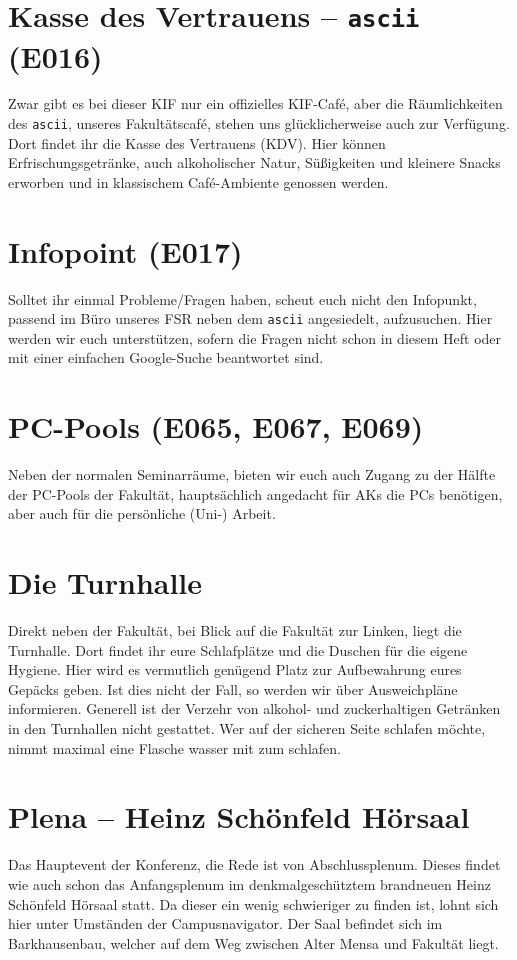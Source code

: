 \section*{Kasse des Vertrauens – \texttt{ascii} (E016)}
Zwar gibt es bei dieser KIF nur ein offizielles KIF-Café, aber die Räumlichkeiten des \texttt{ascii}, unseres Fakultätscafé, stehen uns glücklicherweise auch zur Verfügung.
Dort findet ihr die Kasse des Vertrauens (KDV).
Hier können Erfrischungsgetränke, auch alkoholischer Natur, Süßigkeiten und kleinere Snacks erworben und in klassischem Café-Ambiente genossen werden.

\section*{Infopoint (E017)}
Solltet ihr einmal Probleme/Fragen haben, scheut euch nicht den Infopunkt, passend im Büro unseres FSR neben dem \texttt{ascii} angesiedelt, aufzusuchen.
Hier werden wir euch unterstützen, sofern die Fragen nicht schon in diesem Heft oder mit einer einfachen Google-Suche beantwortet sind.

\section*{PC-Pools (E065, E067, E069)}
Neben der normalen Seminarräume, bieten wir euch auch Zugang zu der Hälfte der PC-Pools der Fakultät, hauptsächlich angedacht für AKs die PCs benötigen, aber auch für die persönliche (Uni-) Arbeit.

\section*{Die Turnhalle}
Direkt neben der Fakultät, bei Blick auf die Fakultät zur Linken, liegt die Turnhalle.
Dort findet ihr eure Schlafplätze und die Duschen für die eigene Hygiene.
Hier wird es vermutlich genügend Platz zur Aufbewahrung eures Gepäcks geben.
Ist dies nicht der Fall, so werden wir über Ausweichpläne informieren.
Generell ist der Verzehr von alkohol- und zuckerhaltigen Getränken in den Turnhallen nicht gestattet.
Wer auf der sicheren Seite schlafen möchte, nimmt maximal eine Flasche wasser mit zum schlafen.

\section*{Plena -- Heinz Schönfeld Hörsaal}
Das Hauptevent der Konferenz, die Rede ist von Abschlussplenum.
Dieses findet wie auch schon das Anfangsplenum im denkmalgeschütztem brandneuen Heinz Schönfeld Hörsaal statt.
Da dieser ein wenig schwieriger zu finden ist, lohnt sich hier unter Umständen der Campusnavigator.
Der Saal befindet sich im Barkhausenbau, welcher auf dem Weg zwischen Alter Mensa und Fakultät liegt.

